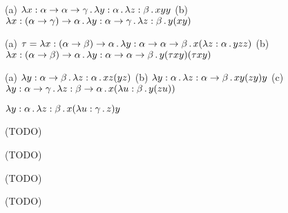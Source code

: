  (a) $\lambda x: \alpha\to\alpha\to\gamma\,.\,\lambda y: \alpha\,.\,\lambda z: \beta\,.\, xyy$\nextquestion
(b) $\lambda x: (\alpha\to\gamma)\to\alpha\,.\,\lambda y:\alpha\to\gamma\,.\,\lambda z:\beta\,.\, y(xy)$

 (a) $\tau=\lambda x:(\alpha\to\beta)\to\alpha\,.\,\lambda y:\alpha\to\alpha\to\beta\,.\,
x(\lambda z:\alpha\,.\, yzz)$\nextquestion
(b) $\lambda x:(\alpha\to\beta)\to\alpha\,.\,\lambda y:\alpha\to\alpha\to\beta\,.\,
y(\tau xy)(\tau xy)$

 (a) $\lambda y: \alpha\to\beta\,.\,\lambda z:\alpha\,.\, xz(yz)$\nextquestion
(b) $\lambda y:\alpha\,.\,\lambda z:\alpha\to\beta\,.\, xy(zy)y$\nextquestion
(c) $\lambda y:\alpha\to\gamma\,.\,\lambda z:\beta\to\alpha\,.\, x(\lambda u:\beta\,.\, y(zu))$

 $\lambda y:\alpha\,.\,\lambda z:\beta\,.\, x(\lambda u:\gamma\,.\, z)y$

 (TODO)

 (TODO)

 (TODO)

 (TODO)

\bye

